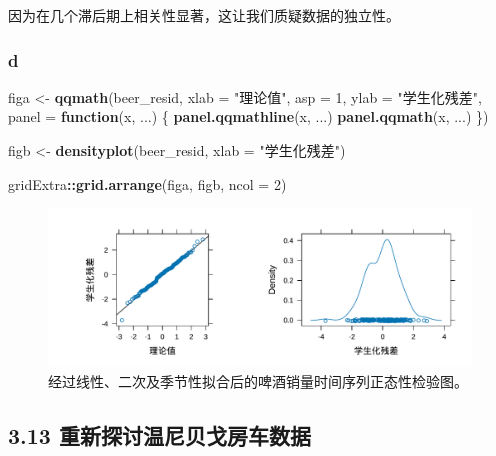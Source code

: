 \documentclass[
]{article}
\newenvironment{Shaded}{\begin{snugshade}}{\end{snugshade}}
\newcommand{\AttributeTok}[1]{\textcolor[rgb]{0.13,0.29,0.53}{#1}}
\newcommand{\ControlFlowTok}[1]{\textcolor[rgb]{0.13,0.29,0.53}{\textbf{#1}}}
\newcommand{\DecValTok}[1]{\textcolor[rgb]{0.00,0.00,0.81}{#1}}
\newcommand{\FunctionTok}[1]{\textcolor[rgb]{0.13,0.29,0.53}{\textbf{#1}}}
\newcommand{\NormalTok}[1]{#1}
\newcommand{\OtherTok}[1]{\textcolor[rgb]{0.56,0.35,0.01}{#1}}
\newcommand{\SpecialCharTok}[1]{\textcolor[rgb]{0.81,0.36,0.00}{\textbf{#1}}}
\newcommand{\StringTok}[1]{\textcolor[rgb]{0.31,0.60,0.02}{#1}}
\begin{document}
因为在几个滞后期上相关性显著，这让我们质疑数据的独立性。

\hypertarget{d-5}{%
\subsubsection*{d}\label{d-5}}

\begin{Shaded}
\begin{Highlighting}[]
\NormalTok{figa }\OtherTok{\textless{}{-}} 
  \FunctionTok{qqmath}\NormalTok{(beer\_resid, }\AttributeTok{xlab =} \StringTok{"理论值"}\NormalTok{,}
       \AttributeTok{asp =} \DecValTok{1}\NormalTok{,}
       \AttributeTok{ylab =} \StringTok{"学生化残差"}\NormalTok{,}
       \AttributeTok{panel =} \ControlFlowTok{function}\NormalTok{(x, ...) \{}
         \FunctionTok{panel.qqmathline}\NormalTok{(x, ...)}
         \FunctionTok{panel.qqmath}\NormalTok{(x, ...)}
\NormalTok{       \})}

\NormalTok{figb }\OtherTok{\textless{}{-}} \FunctionTok{densityplot}\NormalTok{(beer\_resid, }\AttributeTok{xlab =} \StringTok{"学生化残差"}\NormalTok{)}

\NormalTok{gridExtra}\SpecialCharTok{::}\FunctionTok{grid.arrange}\NormalTok{(figa, figb, }\AttributeTok{ncol =} \DecValTok{2}\NormalTok{)}
\end{Highlighting}
\end{Shaded}

\begin{figure}
\centering
\includegraphics{chapter3_files/figure-latex/beer-norm-1.pdf}
\caption{\label{fig:beer-norm}经过线性、二次及季节性拟合后的啤酒销量时间序列正态性检验图。}
\end{figure}

\hypertarget{ux91cdux65b0ux63a2ux8ba8ux6e29ux5c3cux8d1dux6208ux623fux8f66ux6570ux636e}{%
\subsection{3.13 重新探讨温尼贝戈房车数据}\label{ux91cdux65b0ux63a2ux8ba8ux6e29ux5c3cux8d1dux6208ux623fux8f66ux6570ux636e}}
\end{document}
